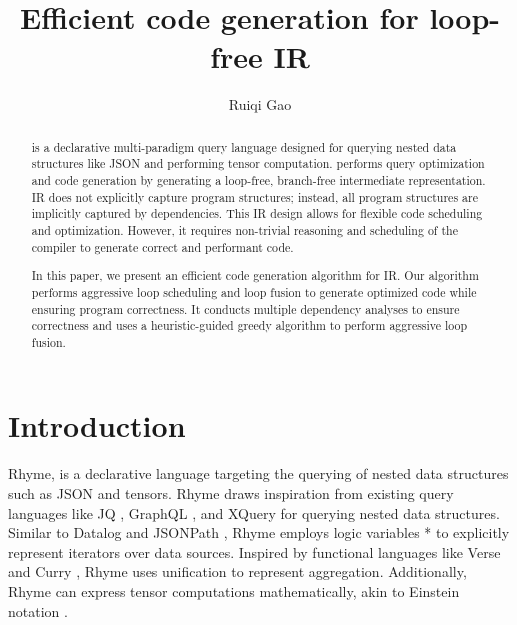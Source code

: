 \documentclass[sigplan, nonacm]{acmart}\settopmatter{printfolios=true,printccs=false,printacmref=false}
\newcommand{\rhyme}{\text{Rhyme}\xspace}
\begin{document}
\sloppy

\title{Efficient code generation for loop-free IR}

\author{Ruiqi Gao}

\begin{abstract}
  \rhyme is a declarative multi-paradigm query language designed for querying nested data structures like JSON and performing tensor computation. \rhyme performs query optimization and code generation by generating a loop-free, branch-free intermediate representation. \rhyme IR does not explicitly capture program structures; instead, all program structures are implicitly captured by dependencies. This IR design allows for flexible code scheduling and optimization. However, it requires non-trivial reasoning and scheduling of the compiler to generate correct and performant code.\par

  In this paper, we present an efficient code generation algorithm for \rhyme IR. Our algorithm performs aggressive loop scheduling and loop fusion to generate optimized code while ensuring program correctness. It conducts multiple dependency analyses to ensure correctness and uses a heuristic-guided greedy algorithm to perform aggressive loop fusion.
\end{abstract}


\maketitle

\section{Introduction}
Rhyme\cite{abeysinghe2024rhyme, abeysingherhyme}, is a declarative language targeting the querying of nested data structures such as JSON and tensors. Rhyme draws inspiration from existing query languages like JQ \cite{jq}, GraphQL \cite{graphql}, and XQuery \cite{xquery} for querying nested data structures. Similar to Datalog \cite{datalog} and JSONPath \cite{jsonpath}, Rhyme employs logic variables * to explicitly represent iterators over data sources. Inspired by functional languages like Verse \cite{verse} and Curry \cite{curry}, Rhyme uses unification to represent aggregation. Additionally, Rhyme can express tensor computations mathematically, akin to Einstein notation \cite{einops, einsumblog, tensor_comprehensions}.
\end{document}
